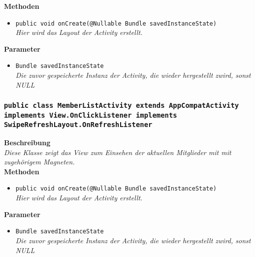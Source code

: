 \documentclass[a4paper]{scrreprt}
\begin{document}
                \textbf{Methoden}
                \begin{itemize}
        		\item\texttt{{public void onCreate(@Nullable Bundle savedInstanceState)}}\\
                \textit{Hier wird das Layout der Activity erstellt.}\\
                \end{itemize}
                
                \textbf{Parameter}
                \begin{itemize}
        		\item\texttt{Bundle savedInstanceState}\\ 
                \textit{Die zuvor gespeicherte Instanz der Activity, die wieder hergestellt zwird, sonst NULL}\\
                \end{itemize} 
                
        \subsubsection{\texttt{public class MemberListActivity extends AppCompatActivity implements View.OnClickListener implements SwipeRefreshLayout.OnRefreshListener}}
               
               	\textbf{Beschreibung} \\
      	        \textit{Diese Klasse zeigt das View zum Einsehen der aktuellen Mitglieder mit
 mit zugehörigem Magneten.} \\
                
                \textbf{Methoden}
                \begin{itemize}
        		\item\texttt{{public void onCreate(@Nullable Bundle savedInstanceState)}}\\
                \textit{Hier wird das Layout der Activity erstellt.}\\
                \end{itemize}
                
                \textbf{Parameter}
                \begin{itemize}
        		\item\texttt{Bundle savedInstanceState}\\  
                \textit{Die zuvor gespeicherte Instanz der Activity, die wieder hergestellt zwird, sonst NULL}\\
                \end{itemize} 
               
\end{document}
